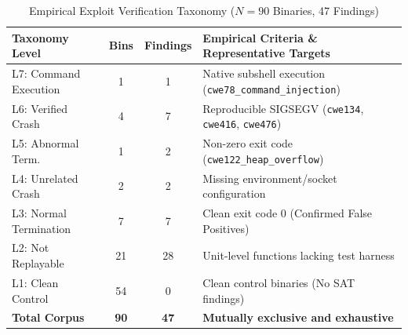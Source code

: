 \documentclass[10pt,conference]{IEEEtran}
\begin{document}
\begin{table}[!t]
\caption{Empirical Exploit Verification Taxonomy ($N = 90$ Binaries, 47 Findings)}
\label{tab:verification_taxonomy}
\renewcommand{\arraystretch}{1.0}
\footnotesize
\setlength\tabcolsep{2.2pt}
\begin{tabular}{lccl}
\toprule
\textbf{Taxonomy Level} & \textbf{Bins} & \textbf{Findings} & \textbf{Empirical Criteria \& Representative Targets} \\
\midrule
L7: Command Execution   & 1  & 1  & Native subshell execution (\texttt{cwe78\_command\_injection}) \\
L6: Verified Crash      & 4  & 7  & Reproducible SIGSEGV (\texttt{cwe134}, \texttt{cwe416}, \texttt{cwe476}) \\
L5: Abnormal Term.      & 1  & 2  & Non-zero exit code (\texttt{cwe122\_heap\_overflow}) \\
L4: Unrelated Crash     & 2  & 2  & Missing environment/socket configuration \\
L3: Normal Termination  & 7  & 7  & Clean exit code 0 (Confirmed False Positives) \\
L2: Not Replayable      & 21 & 28 & Unit-level functions lacking test harness \\
L1: Clean Control       & 54 & 0  & Clean control binaries (No SAT findings) \\
\midrule
\textbf{Total Corpus}   & \textbf{90} & \textbf{47} & \textbf{Mutually exclusive and exhaustive} \\
\bottomrule
\end{tabular}
\end{table}
\end{document}

